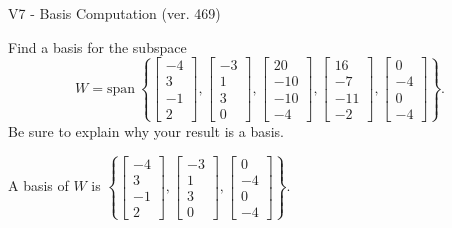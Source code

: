 \begin{exercise}
  \begin{exerciseTitle}V7 - Basis Computation (ver. 469)\end{exerciseTitle}
  \begin{exerciseStatement}
    Find a basis for the subspace 
\[W=\mathrm{span}\ \left\{\left[\begin{array}{r}
-4 \\
3 \\
-1 \\
2
\end{array}\right] , \left[\begin{array}{r}
-3 \\
1 \\
3 \\
0
\end{array}\right] , \left[\begin{array}{r}
20 \\
-10 \\
-10 \\
-4
\end{array}\right] , \left[\begin{array}{r}
16 \\
-7 \\
-11 \\
-2
\end{array}\right] , \left[\begin{array}{r}
0 \\
-4 \\
0 \\
-4
\end{array}\right]\right\}.\]
 Be sure to explain why your result is a basis.


  \end{exerciseStatement}
  \begin{exerciseAnswer}
   A basis of \(W\) is  \(\left\{\left[\begin{array}{r}
-4 \\
3 \\
-1 \\
2
\end{array}\right] , \left[\begin{array}{r}
-3 \\
1 \\
3 \\
0
\end{array}\right] , \left[\begin{array}{r}
0 \\
-4 \\
0 \\
-4
\end{array}\right]\right\}\).
  


  \end{exerciseAnswer}
\end{exercise}